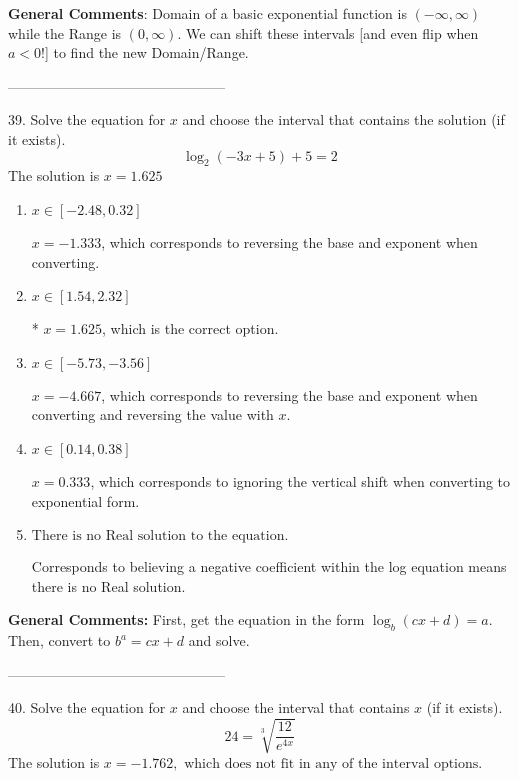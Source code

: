 \documentclass{article}[14pt]
\begin{document}
\textbf{General Comments}: Domain of a basic exponential function is $(-\infty, \infty)$ while the Range is $(0, \infty)$. We can shift these intervals [and even flip when $a<0$!] to find the new Domain/Range.

-----------------------------------------------

39. Solve the equation for $x$ and choose the interval that contains the solution (if it exists).
$$ \log_{2}{(-3x+5)}+5 = 2 $$ 
The solution is $ x = 1.625 $ 

\begin{enumerate}[label=\Alph*.] 
\item $ x \in [-2.48, 0.32] $ 

 $x = -1.333$, which corresponds to reversing the base and exponent when converting. 
\item $ x \in [1.54, 2.32] $ 

 * $x = 1.625$, which is the correct option. 
\item $ x \in [-5.73, -3.56] $ 

 $x = -4.667$, which corresponds to reversing the base and exponent when converting and reversing the value with $x$. 
\item $ x \in [0.14, 0.38] $ 

 $x = 0.333$, which corresponds to ignoring the vertical shift when converting to exponential form. 
\item $ \text{There is no Real solution to the equation.} $ 

 Corresponds to believing a negative coefficient within the log equation means there is no Real solution. 
\end{enumerate} 
 
\textbf{General Comments:} First, get the equation in the form $\log_b{(cx+d)} = a$. Then, convert to $b^a = cx+d$ and solve.

-----------------------------------------------

40.  Solve the equation for $x$ and choose the interval that contains $x$ (if it exists).
$$  24 = \sqrt[3]{\frac{12}{e^{4x}}} $$ 
The solution is $ x = -1.762, \text{ which does not fit in any of the interval options.} $ 
\end{document}
